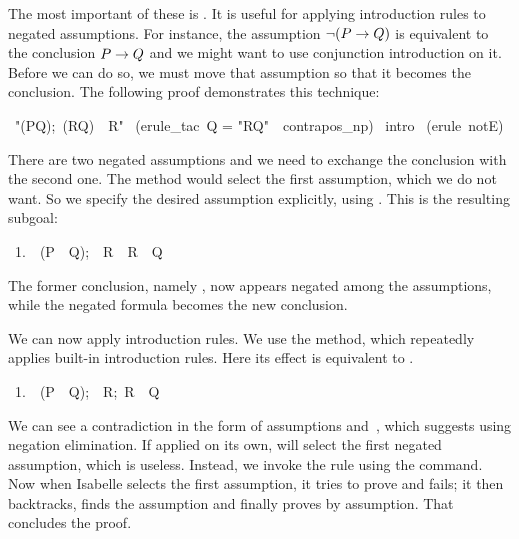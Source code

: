 The most important of these is .  It is useful
for applying introduction rules to negated assumptions.  For instance, 
the assumption $\neg(P\rightarrow Q)$ is equivalent to the conclusion $P\rightarrow Q$ and we 
might want to use conjunction introduction on it. 
Before we can do so, we must move that assumption so that it 
becomes the conclusion. The following proof demonstrates this 
technique: 
\begin{isabelle}
\ "\isasymlbrakk{\isasymnot}(P{\isasymlongrightarrow}Q);\
\isasymnot(R{\isasymlongrightarrow}Q)\isasymrbrakk\ \isasymLongrightarrow\
R"\isanewline
\isacommand{apply}\ (erule_tac\ Q = "R{\isasymlongrightarrow}Q"\ \
contrapos_np)\isanewline
{}\ intro\isanewline
\isacommand{by}\ (erule\ notE)
\end{isabelle}
%
There are two negated assumptions and we need to exchange the conclusion with the
second one.  The method  would select the first assumption,
which we do not want.  So we specify the desired assumption explicitly, using
\isa{erule_tac}.  This is the resulting subgoal: 
\begin{isabelle}
\ 1.\ \isasymlbrakk{\isasymnot}\ (P\ \isasymlongrightarrow\ Q);\ \isasymnot\
R\isasymrbrakk\ \isasymLongrightarrow\ R\ \isasymlongrightarrow\ Q%
\end{isabelle}
The former conclusion, namely , now appears negated among the assumptions,
while the negated formula \isa{R\ \isasymlongrightarrow\ Q} becomes the new
conclusion.

We can now apply introduction rules.  We use the {\isa{intro}} method, which
repeatedly  applies built-in introduction rules.  Here its effect is equivalent
to .
\begin{isabelle}
\ 1.\ \isasymlbrakk{\isasymnot}\ (P\ \isasymlongrightarrow\ Q);\ \isasymnot\ R;\
R\isasymrbrakk\ \isasymLongrightarrow\ Q%
\end{isabelle}
We can see a contradiction in the form of assumptions 
and~, which suggests using negation elimination.  If applied on its own,
\isa{notE} will select the first negated assumption, which is useless.  
Instead, we invoke the rule using the
\isa{by} command.
Now when Isabelle selects the first assumption, it tries to prove  and fails; it then backtracks, finds the 
assumption \isa{\isasymnot~R} and finally proves \isa{R} by assumption.  That
concludes the proof.

\medskip

